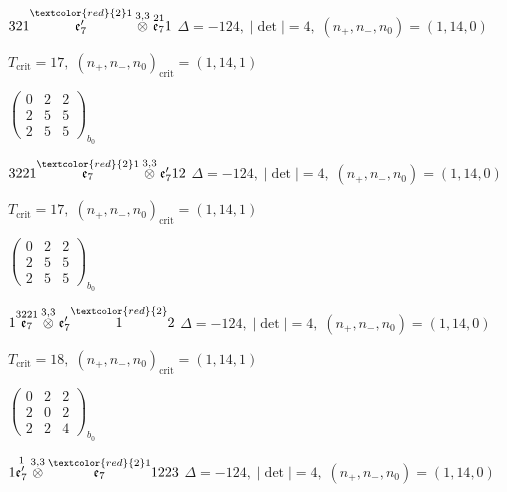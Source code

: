 \documentclass[10pt]{article}
\begin{document}
$321\overset{\textcolor{red}{2}1}{\mathfrak{e}_7'}\overset{3,3}{\otimes}\overset{21}{\mathfrak{e}_7}1$ \quad $\Delta=-124,\; |\det|=4,\; (n_+,n_-,n_0)=(1,14,0)$

\hspace{1em}$T_{\text{crit}}=17,\; (n_+,n_-,n_0)_{\text{crit}}=(1,14,1)$

\hspace{2em}$\left(\begin{smallmatrix}0 & 2 & 2 \\ 2 & 5 & 5 \\ 2 & 5 & 5\end{smallmatrix}\right)_{\!b_0}$

\smallskip

$3221\overset{\textcolor{red}{2}1}{\mathfrak{e}_7}\overset{3,3}{\otimes}\mathfrak{e}_7'12$ \quad $\Delta=-124,\; |\det|=4,\; (n_+,n_-,n_0)=(1,14,0)$

\hspace{1em}$T_{\text{crit}}=17,\; (n_+,n_-,n_0)_{\text{crit}}=(1,14,1)$

\hspace{2em}$\left(\begin{smallmatrix}0 & 2 & 2 \\ 2 & 5 & 5 \\ 2 & 5 & 5\end{smallmatrix}\right)_{\!b_0}$

$1\overset{3221}{\mathfrak{e}_7}\overset{3,3}{\otimes}\mathfrak{e}_7'\overset{\textcolor{red}{2}}{1}2$ \quad $\Delta=-124,\; |\det|=4,\; (n_+,n_-,n_0)=(1,14,0)$

\hspace{1em}$T_{\text{crit}}=18,\; (n_+,n_-,n_0)_{\text{crit}}=(1,14,1)$

\hspace{2em}$\left(\begin{smallmatrix}0 & 2 & 2 \\ 2 & 0 & 2 \\ 2 & 2 & 4\end{smallmatrix}\right)_{\!b_0}$

\smallskip

$1\overset{1}{\mathfrak{e}_7'}\overset{3,3}{\otimes}\overset{\textcolor{red}{2}1}{\mathfrak{e}_7}1223$ \quad $\Delta=-124,\; |\det|=4,\; (n_+,n_-,n_0)=(1,14,0)$
\end{document}
